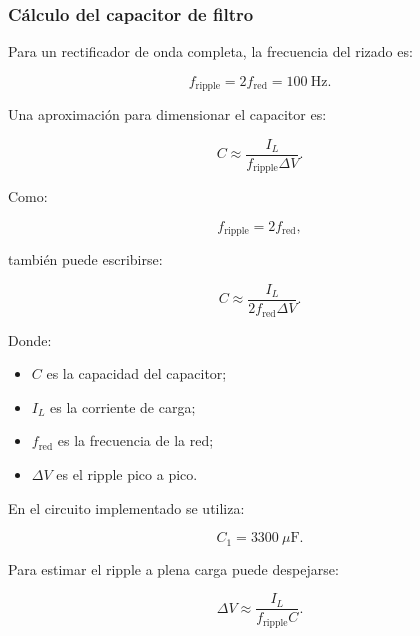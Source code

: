 \documentclass[12pt,a4paper]{article}
\begin{document}
	\subsubsection{Cálculo del capacitor de filtro}
	
	Para un rectificador de onda completa, la frecuencia del rizado es:
	
	\begin{equation}
		f_{\mathrm{ripple}}
		=
		2f_{\mathrm{red}}
		=
		100~\text{Hz}.
	\end{equation}
	
	Una aproximación para dimensionar el capacitor es:
	
	\begin{equation}
		C
		\approx
		\frac{I_L}
		{f_{\mathrm{ripple}}\Delta V}.
	\end{equation}
	
	Como:
	
	\begin{equation}
		f_{\mathrm{ripple}}
		=
		2f_{\mathrm{red}},
	\end{equation}
	
	también puede escribirse:
	
	\begin{equation}
		C
		\approx
		\frac{I_L}
		{2f_{\mathrm{red}}\Delta V}.
	\end{equation}
	
	Donde:
	
	\begin{itemize}
		\item $C$ es la capacidad del capacitor;
		\item $I_L$ es la corriente de carga;
		\item $f_{\mathrm{red}}$ es la frecuencia de la red;
		\item $\Delta V$ es el ripple pico a pico.
	\end{itemize}
	
	En el circuito implementado se utiliza:
	
	\begin{equation}
		C_1
		=
		3300~\mu\text{F}.
	\end{equation}
	
	Para estimar el ripple a plena carga puede despejarse:
	
	\begin{equation}
		\Delta V
		\approx
		\frac{I_L}
		{f_{\mathrm{ripple}}C}.
	\end{equation}
	
\end{document}
